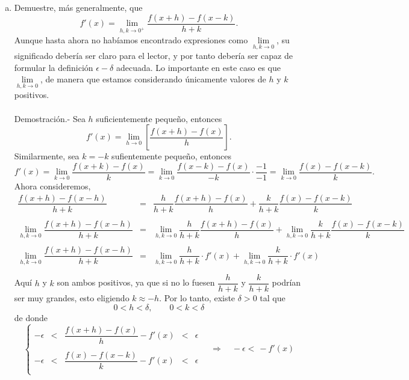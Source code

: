 \begin{enumerate}[\bfseries 1]
\begin{enumerate}[(a)]
	    \item Demuestre, más generalmente, que 
	    $$f'(x)=\lim_{h,k\to 0^+}\dfrac{f(x+h)-f(x-k)}{h+k}.$$
	    Aunque hasta ahora no habíamos encontrado expresiones como $\lim\limits_{h,k \to 0}$, su significado debería ser claro para el lector, y por tanto debería ser capaz de formular la definición $\epsilon-\delta$ adecuada. Lo importante en este caso es que $\lim\limits_{h,k\to 0}$, de manera que estamos considerando únicamente valores de $h$ y $k$ positivos.\\\\
		Demostración.-\; Sea $h$ suficientemente pequeño, entonces
		$$f'(x)=\lim_{h\to 0}\left[\dfrac{f(x+h)-f(x)}{h}\right].$$
		Similarmente, sea $k=-k$ sufientemente pequeño, entonces
		$$f'(x)=\lim_{k\to 0}\dfrac{f(x+k)-f(x)}{k}=\lim_{k\to 0}\dfrac{f(x-k)-f(x)}{-k} \cdot \dfrac{-1}{-1} = \lim_{k\to 0}\dfrac{f(x)-f(x-k)}{k}.$$
		Ahora consideremos,
		$$\begin{array}{rcl}
		    \dfrac{f(x+h)-f(x-h)}{h+k}&=&\dfrac{h}{h+k}\dfrac{f(x+h)-f(x)}{h}+\dfrac{k}{h+k}\dfrac{f(x)-f(x-k)}{k}\\\\
		    \lim\limits_{h,k\to 0}\dfrac{f(x+h)-f(x-h)}{h+k}&=&\lim\limits_{h,k\to 0}\dfrac{h}{h+k}\dfrac{f(x+h)-f(x)}{h}+\lim\limits_{h,k\to 0}\dfrac{k}{h+k}\dfrac{f(x)-f(x-k)}{k}\\\\
		    \lim\limits_{h,k\to 0}\dfrac{f(x+h)-f(x-h)}{h+k}&=&\lim\limits_{h,k\to 0}\dfrac{h}{h+k}\cdot f'(x)+\lim\limits_{h,k\to 0}\dfrac{k}{h+k}\cdot f'(x)\\\\
		\end{array}$$
		Aquí $h$ y $k$ son ambos positivos, ya que si no lo fuesen $\dfrac{h}{h+k}$ y $\dfrac{k}{h+k}$ podrían ser muy grandes, esto eligiendo $k\approx-h$. Por lo tanto, existe $\delta>0$ tal que 
		$$0<h<\delta,\qquad 0<k<\delta$$
		de donde 
		$$\left\{\begin{array}{rcccl}
		    -\epsilon&<&\dfrac{f(x+h)-f(x)}{h}-f'(x)&<&\epsilon\\\\
		    -\epsilon&<&\dfrac{f(x)-f(x-k)}{k}-f'(x)&<&\epsilon\\
	    \end{array}\right.\quad \Rightarrow \quad -\epsilon<\dfrac{}{}-f'(x)$$




	\end{enumerate}
	
\end{enumerate}
